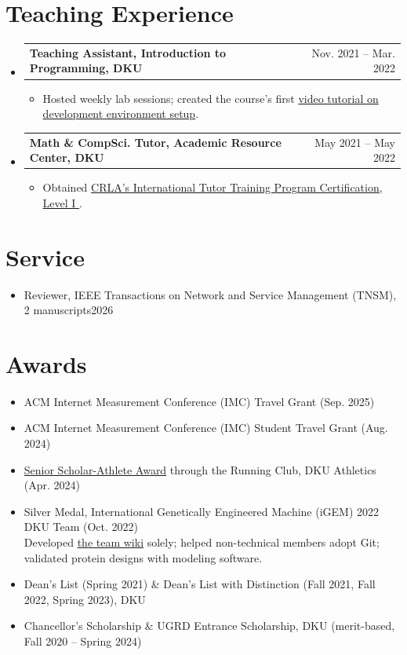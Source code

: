 \documentclass[letterpaper,11pt]{article}
\makeatletter
\newcommand{\CVItem}[1]{
  \item{\small
    {#1}
  }
}
\newcommand{\CVSubheadingFrame}[1]{
  \item
    \begin{tabular*}{0.97\textwidth}[t]{l@{\extracolsep{\fill}}r}
        #1
    \end{tabular*}
}
\newcommand{\CVSubHeadingListStart}{\begin{itemize}[leftmargin=1.2em, label={}]}
\newcommand{\CVSubHeadingListEnd}{\end{itemize}}
\newcommand{\CVItemListStart}{\begin{itemize}}
\newcommand{\CVItemListEnd}{\end{itemize}}
\newcommand{\uhref}[2]{\href{#1}{\textcolor{darkbluepurple}{#2}}}
\makeatother
\begin{document}
\begin{refsection}
    \nocite{luo2024fedcampus}
    \printbibliography[title=Invited Talks]
\end{refsection}

\section{Teaching Experience}
\CVSubHeadingListStart
\CVSubheadingFrame
{\textbf{Teaching Assistant, Introduction to Programming, DKU}&
    Nov. 2021 -- Mar. 2022
}
\CVItemListStart
\CVItem
{Hosted weekly lab sessions; created the course's first
    \uhref{https://www.youtube.com/watch?v=yiL-ULPBkvE}{video tutorial on
        development environment setup}.
}
\CVItemListEnd

\CVSubheadingFrame
{\textbf{Math \& CompSci. Tutor, Academic Resource Center, DKU}&
    May 2021 -- May 2022
}
\CVItemListStart
\CVItem
{Obtained \uhref
    {https://github.com/SichangHe/curriculum_vitae/files/11665403/CRLA_certificate.pdf}
    {CRLA's International Tutor Training Program Certification,
        Level I%
    }.}
\CVItemListEnd
\CVSubHeadingListEnd

\section{Service}
\begin{itemize}
    \item Reviewer, IEEE Transactions on Network and Service Management
    (TNSM), 2 manuscripts\hfill 2026
\end{itemize}

\section{Awards}
\begin{itemize}
    \item ACM Internet Measurement Conference (IMC) Travel Grant (Sep. 2025)
    \item ACM Internet Measurement Conference (IMC) Student Travel Grant (Aug. 2024)
    \item \uhref{https://github.com/SichangHe/curriculum_vitae/files/15110729/scholar_athelete_award_DKU_running_club.pdf}
    {Senior Scholar-Athlete Award} through the Running Club,
    DKU Athletics (Apr. 2024)

    \item Silver Medal, International Genetically Engineered Machine (iGEM)
    2022 DKU Team (Oct. 2022)\\{\small
    Developed \uhref{https://github.com/SichangHe/igem-2022-dku-backup}
    {the team wiki} solely; helped non-technical members adopt Git;
    validated protein designs with modeling software.
    }
    \item Dean's List (Spring 2021) \&
    Dean's List with Distinction (Fall 2021, Fall 2022, Spring 2023),
    DKU
    \item Chancellor's Scholarship \& UGRD Entrance Scholarship, DKU
    (merit-based, Fall 2020 -- Spring 2024)
\end{itemize}
\end{document}
